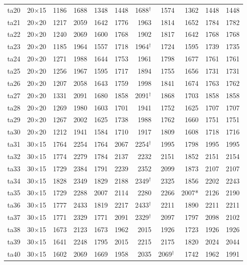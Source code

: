 {\begin{longtable}{lrrrrrrrrrr}
ta20 & 20$\times$15 & 1186 & 1688 & 1348 & 1448 & 1688$^\dagger$ & 1574 & 1362 & 1448 & 1448 \\
ta21 & 20$\times$20 & 1217 & 2059 & 1642 & 1776 & 1963 & 1814 & 1652 & 1784 & 1782 \\
ta22 & 20$\times$20 & 1240 & 2069 & 1600 & 1768 & 1902 & 1817 & 1642 & 1768 & 1768 \\
ta23 & 20$\times$20 & 1185 & 1964 & 1557 & 1718 & 1964$^\dagger$ & 1724 & 1595 & 1739 & 1735 \\
ta24 & 20$\times$20 & 1271 & 1988 & 1644 & 1753 & 1961 & 1798 & 1677 & 1761 & 1761 \\
ta25 & 20$\times$20 & 1256 & 1967 & 1595 & 1717 & 1894 & 1755 & 1656 & 1731 & 1731 \\
ta26 & 20$\times$20 & 1207 & 2058 & 1643 & 1759 & 1998 & 1841 & 1674 & 1763 & 1762 \\
ta27 & 20$\times$20 & 1331 & 2091 & 1680 & 1858 & 2091$^\dagger$ & 1868 & 1703 & 1858 & 1858 \\
ta28 & 20$\times$20 & 1269 & 1980 & 1603 & 1701 & 1941 & 1752 & 1625 & 1707 & 1707 \\
ta29 & 20$\times$20 & 1267 & 2002 & 1625 & 1738 & 1988 & 1762 & 1660 & 1751 & 1751 \\
ta30 & 20$\times$20 & 1212 & 1941 & 1584 & 1710 & 1917 & 1809 & 1608 & 1718 & 1716 \\
ta31 & 30$\times$15 & 1764 & 2254 & 1764 & 2067 & 2254$^\dagger$ & 1995 & 1798 & 1995 & 1995 \\
ta32 & 30$\times$15 & 1774 & 2279 & 1784 & 2137 & 2232 & 2151 & 1852 & 2151 & 2154 \\
ta33 & 30$\times$15 & 1729 & 2384 & 1791 & 2239 & 2352 & 2099 & 1873 & 2107 & 2107 \\
ta34 & 30$\times$15 & 1828 & 2349 & 1829 & 2188 & 2349$^\dagger$ & 2325 & 1856 & 2202 & 2243 \\
ta35 & 30$\times$15 & 1729 & 2288 & 2007 & 2114 & 2280 & 2266 & 2007* & 2126 & 2190 \\
ta36 & 30$\times$15 & 1777 & 2433 & 1819 & 2217 & 2433$^\dagger$ & 2211 & 1890 & 2211 & 2211 \\
ta37 & 30$\times$15 & 1771 & 2329 & 1771 & 2091 & 2329$^\dagger$ & 2097 & 1797 & 2098 & 2102 \\
ta38 & 30$\times$15 & 1673 & 2123 & 1673 & 1962 & 2015 & 1926 & 1723 & 1926 & 1926 \\
ta39 & 30$\times$15 & 1641 & 2248 & 1795 & 2015 & 2215 & 2175 & 1820 & 2024 & 2044 \\
ta40 & 30$\times$15 & 1602 & 2069 & 1669 & 1958 & 2035 & 2069$^\dagger$ & 1742 & 1962 & 1991 \\

\end{longtable}}

